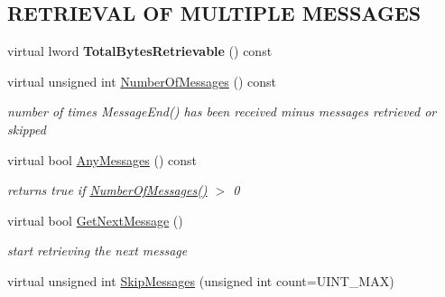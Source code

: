 \subsection*{RETRIEVAL OF MULTIPLE MESSAGES}
\label{_amgrp9d958c73fb392bf33c4da23b0d204fb1}
 \begin{DoxyCompactItemize}
\item 
\hypertarget{class_buffered_transformation_a07f77da46fcfec265d19c50fd016105b}{
virtual lword {\bfseries TotalBytesRetrievable} () const }
\label{class_buffered_transformation_a07f77da46fcfec265d19c50fd016105b}

\item 
\hypertarget{class_buffered_transformation_ab59e832aabe7f594cade9af01a00bce6}{
virtual unsigned int \hyperlink{class_buffered_transformation_ab59e832aabe7f594cade9af01a00bce6}{NumberOfMessages} () const }
\label{class_buffered_transformation_ab59e832aabe7f594cade9af01a00bce6}

\begin{DoxyCompactList}\small\item\em number of times MessageEnd() has been received minus messages retrieved or skipped \item\end{DoxyCompactList}\item 
\hypertarget{class_buffered_transformation_adb4533d9b3df5b25b5168cb89badf1a9}{
virtual bool \hyperlink{class_buffered_transformation_adb4533d9b3df5b25b5168cb89badf1a9}{AnyMessages} () const }
\label{class_buffered_transformation_adb4533d9b3df5b25b5168cb89badf1a9}

\begin{DoxyCompactList}\small\item\em returns true if \hyperlink{class_buffered_transformation_ab59e832aabe7f594cade9af01a00bce6}{NumberOfMessages()} $>$ 0 \item\end{DoxyCompactList}\item 
virtual bool \hyperlink{class_buffered_transformation_aa7adffcae350fe528520a2427b21c0a9}{GetNextMessage} ()
\begin{DoxyCompactList}\small\item\em start retrieving the next message \item\end{DoxyCompactList}\item 
\hypertarget{class_buffered_transformation_a129710fdfddb97b7ddb51010d0c7c535}{
virtual unsigned int \hyperlink{class_buffered_transformation_a129710fdfddb97b7ddb51010d0c7c535}{SkipMessages} (unsigned int count=UINT\_\-MAX)}
\label{class_buffered_transformation_a129710fdfddb97b7ddb51010d0c7c535}


\end{DoxyCompactItemize}
